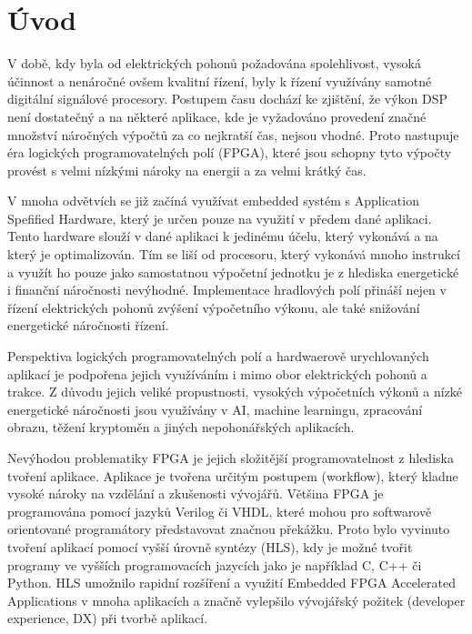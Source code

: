 \documentclass[a4paper, twoside, 11pt]{article}
\begin{document}
\null\newpage
\null\newpage %
\setcounter{page}{1}

\section{Úvod}
V době, kdy byla od elektrických pohonů požadována spolehlivost, vysoká účinnost a nenáročné ovšem kvalitní řízení, byly k řízení využívány samotné digitální signálové procesory. Postupem času dochází ke zjištění, že výkon DSP není dostatečný a na některé aplikace, kde je vyžadováno provedení značné množství náročných výpočtů za co nejkratší čas, nejsou vhodné. Proto nastupuje éra logických programovatelných polí (FPGA), které jsou schopny tyto výpočty provést s velmi nízkými nároky na energii a za velmi krátký čas.\par
V mnoha odvětvích se již začíná využívat embedded systém s Application Spefified Hardware, který je určen pouze na využití v předem dané aplikaci. Tento hardware slouží v dané aplikaci k jedinému účelu, který vykonává a na který je optimalizován. Tím se liší od procesoru, který vykonává mnoho instrukcí a využít ho pouze jako samostatnou výpočetní jednotku je z hlediska energetické i finanční náročnosti nevýhodné. Implementace hradlových polí přináší nejen v řízení elektrických pohonů zvýšení výpočetního výkonu, ale také snižování energetické náročnosti řízení.\par
Perspektiva logických programovatelných polí a hardwaerově urychlovaných aplikací je podpořena jejich využíváním i mimo obor elektrických pohonů a trakce. Z důvodu jejich veliké propustnosti, vysokých výpočetních výkonů a nízké energetické náročnosti jsou využívány v AI, machine learningu, zpracování obrazu, těžení kryptoměn a jiných nepohonářských aplikacích.\par
Nevýhodou problematiky FPGA je jejich složitější programovatelnost z hlediska tvoření aplikace. Aplikace je tvořena určitým postupem (workflow), který kladne vysoké nároky na vzdělání a zkušenosti vývojářů. Většina FPGA je programována pomocí jazyků Verilog či VHDL, které mohou pro softwarově orientované programátory představovat značnou překážku. Proto bylo vyvinuto tvoření aplikací pomocí vyšší úrovně syntézy (HLS), kdy je možné tvořit programy ve vyšších programovacích jazycích jako je například C, C++ či Python. HLS umožnilo rapidní rozšíření a využití Embedded FPGA Accelerated Applications v mnoha aplikacích a značně vylepšilo vývojářský požitek (developer experience, DX) při tvorbě aplikací.\par
\end{document}
